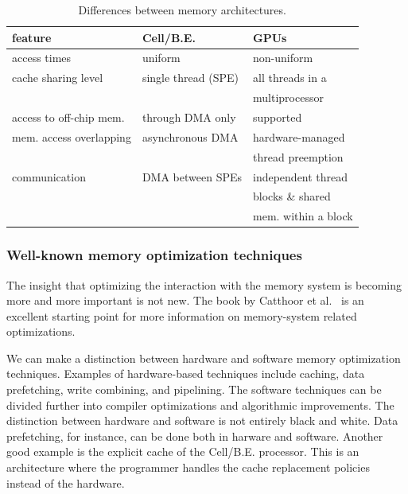 \documentclass{article}
\begin{document}
\begin{table}[t]
\begin{center}
{\footnotesize
\begin{tabular}{|l|l|l|}
\hline
feature                   & Cell/B.E.                      & GPUs \\
\hline
access times              & uniform                        & non-uniform \\
\hline
cache sharing level       & single thread (SPE)            & all threads in a \\
                          &                                & multiprocessor \\
\hline
access to off-chip mem.   & through DMA only               & supported \\
\hline
mem. access overlapping   & asynchronous DMA               & hardware-managed \\
                          &                                & thread preemption \\
\hline
communication             & DMA between SPEs               & independent thread  \\
                          &                                & blocks \& shared   \\
                          &                                & mem. within a block \\
\hline
\end{tabular}
} %
\end{center}
\vspace{-0.5cm}
\caption{Differences between memory architectures.}
\label{memory-properties}
\end{table}



\subsubsection{Well-known memory optimization techniques}

The insight that optimizing the interaction with the memory system is
becoming more and more important is not new.  The book by Catthoor et
al.~\cite{data-access} is an excellent starting point for more
information on memory-system related optimizations. 

We can make a distinction between hardware and software memory
optimization techniques.  Examples of hardware-based techniques include caching, data
prefetching, write combining, and pipelining. The software techniques can be divided
further into compiler optimizations and algorithmic improvements.
  The distinction between hardware and
software is not entirely black and white. Data prefetching, for
instance, can be done both in harware and software.  Another good
example is the explicit cache of the \mbox{Cell/B.E.} processor. This is
an architecture where the programmer handles the cache
replacement policies instead of the hardware.
\end{document}
